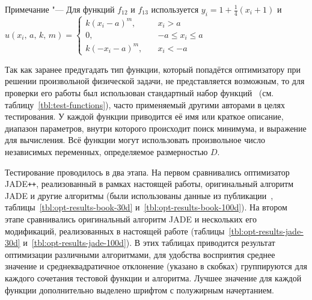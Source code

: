 \begin{longtabu}
{            \hspace*{2.5em}%
            Примечание "---  Для функций $f_{12}$ и $f_{13}$
            используется $y_i = 1 + \frac{1}{4}(x_i+1)$ и
            $u(x_i,\,a,\,k,\,m)=\begin{cases}
k(x_i-a)^m,\quad &x_i >a\\[-0.5em]
0,\quad &-a\leq x_i \leq a\\[-0.5em]
k(-x_i-a)^m,\quad &x_i <-a
\end{cases}$  }   \\        \bottomrule %
\end{longtabu} \endgroup

Так как заранее предугадать тип функции, который попадётся
оптимизатору при решении произвольной физической задачи, не
представляется возможным, то для проверки его работы был использован
стандартный набор
функций~\cite{Schwefel-1981,Rosenbrock-1960,Muhlenbein-1991,back-1996,Griewank-1981}
(см. таблицу~\ref{tbl:test-functions}), часто применяемый другими
авторами в целях тестирования. У каждой функции приводится её имя или
краткое описание, диапазон параметров, внутри которого происходит
поиск минимума, и выражение для вычисления. Всё функции могут
использовать произвольное число независимых переменных, определяемое
размерностью $D$.

Тестирование проводилось в два этапа. На первом сравнивались 
оптимизатор JADE\texttt{++}, реализованный в рамках настоящей
работы, оригинальный алгоритм JADE и другие алгоритмы (были
использованы данные из публикации~\cite{Jingqiao-JADE-2009},
таблицы~\ref{tbl:opt-results-book-30d}
и~\ref{tbl:opt-results-book-100d}). На втором этапе сравнивались
оригинальный алгоритм JADE и нескольких его модификаций,
реализованных в настоящей работе
(таблицы~\ref{tbl:opt-results-jade-30d}
и~\ref{tbl:opt-results-jade-100d}).  В этих таблицах приводится
результат оптимизации различными алгоритмами, для удобства восприятия
среднее значение и среднеквадратичное отклонение (указано в скобках)
группируются для каждого сочетания тестовой функции и
алгоритма. Лучшее значение для каждой функции дополнительно выделено
шрифтом с полужирным начертанием.

\begingroup %
\newcommand\z{\bfseries}
\renewcommand\altshape{\ifthenelse{\therowcnt = 0 }{%
}{
  \ifnumodd{\value{rowcnt}}{}{\vspace*{-0.8ex}}}
}
\newcolumntype{A}{ >{\altshape}X[1mc]}

